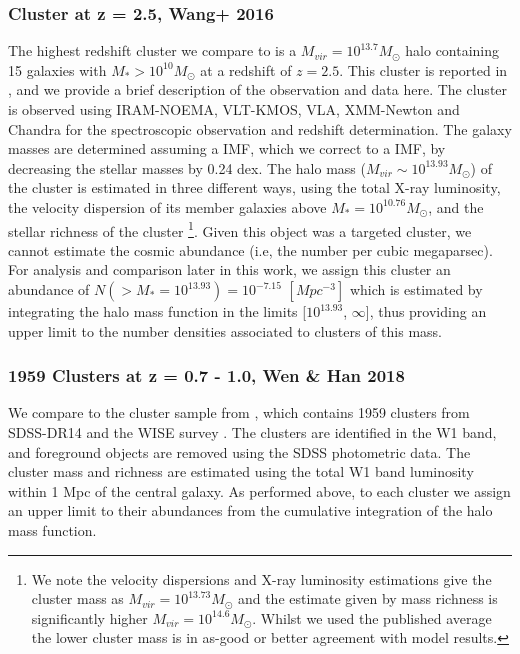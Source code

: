 \subsubsection{Cluster at z = 2.5, Wang+ 2016}
\label{subsubsec:Wang}
The highest redshift cluster we compare to is a $M_{vir} = 10^{13.7} M_{\odot}$ halo containing 15 galaxies with $M_* > 10^{10} M_{\odot}$ at a redshift of $z = 2.5$.
This cluster is reported in \citet{Wang2016DISCOVERY2.506}, and we provide a brief description of the observation and data here.
The cluster is observed using IRAM-NOEMA, VLT-KMOS, VLA, XMM-Newton and Chandra for the spectroscopic observation and redshift determination.  
The galaxy masses are determined assuming a \citet{Salpeter1955TheEvolution.} IMF, which we correct to a \citet{Chabrier2003GalacticFunction} IMF, by decreasing the stellar masses by 0.24 dex.
The halo mass ($M_{vir} \sim 10^{13.93} M_{\odot}$) of the cluster is estimated in three different ways, using the total X-ray luminosity, the velocity dispersion of its member galaxies above $M_* = 10^{10.76} M_{\odot}$, and the stellar richness of the cluster \footnote{We note the velocity dispersions and X-ray luminosity estimations give the cluster mass as $M_{vir} = 10^{13.73} M_{\odot}$ and the estimate given by mass richness is significantly higher $M_{vir} = 10^{14.6} M_{\odot}$. Whilst we used the published average the lower cluster mass is in as-good or better agreement with model results.}. Given this object was a targeted cluster, we cannot estimate the cosmic abundance (i.e, the number per cubic megaparsec). For analysis and comparison later in this work, we assign this cluster an abundance of $N(> M_*=10^{13.93})=10^{-7.15}$ $[Mpc^{-3}]$ which is estimated by integrating the halo mass function in the limits [$10^{13.93}$, $\infty$], thus providing an upper limit to the number densities associated to clusters of this mass. 

\subsubsection{1959 Clusters at z = 0.7 - 1.0, Wen \& Han 2018}
\label{subsubsec:1959}
We compare to the cluster sample from \citet{Wen2018ARedshifts}, which contains 1959 clusters from SDSS-DR14 \citep{Abolfathi2017TheExperiment} and the WISE survey \citep{Wright2010THEPERFORMANCE}. The clusters are identified in the W1 band, and foreground objects are removed using the SDSS photometric data. The cluster mass and richness are estimated using the total W1 band luminosity within 1 Mpc of the central galaxy. As performed above, to each cluster we assign an upper limit to their abundances from the cumulative integration of the halo mass function.

